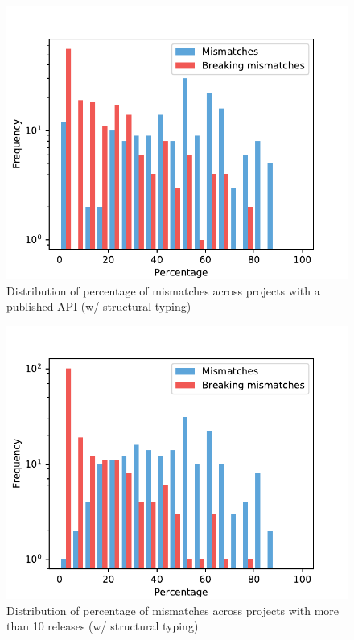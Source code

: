 \documentclass{l4proj}
\begin{document}
\begin{appendices}
\begin{figure}[]
\centering
\caption{Distribution of percentage of mismatches across projects with
a published API (w/ structural typing)}
\label{StrDistributionPublishedAPI}
\includegraphics[height=0.4\textheight]{images/evaluation/str_distribution_mismatches_major_version_1}
\end{figure}

\begin{figure}[]
\centering
\caption{Distribution of percentage of mismatches across projects with
more than 10 releases (w/ structural typing)}
\label{StrDistributionTenReleases}
\includegraphics[height=0.4\textheight]{images/evaluation/str_distribution_mismatches_more_than_10}
\end{figure}


\end{appendices}
\end{document}
